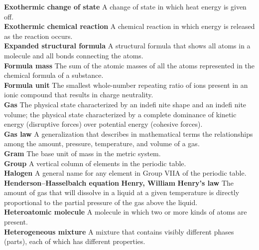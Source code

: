 \documentclass[10pt, roman]{article}
\begin{document}
\begin{minipage}[c]{0.30\textwidth}
\textbf{Exothermic change of state} A change of state in which heat energy is given off. \\
\textbf{Exothermic chemical reaction} A chemical reaction in which energy is released as the reaction occurs. \\
\textbf{Expanded structural formula} A structural formula that shows all atoms in a molecule and all bonds connecting the atoms. \\
\textbf{Formula mass} The sum of the atomic masses of all the atoms represented in the chemical formula of a substance. \\
\textbf{Formula unit} The smallest whole-number repeating ratio of ions present in an ionic compound that results in charge neutrality. \\
\textbf{Gas} The physical state characterized by an indefi nite shape and an indefi nite volume; the physical state characterized by a complete dominance of kinetic energy (disruptive forces) over potential energy (cohesive forces). \\
\textbf{Gas law} A generalization that describes in mathematical terms the relationships among the amount, pressure, temperature, and volume of a gas. \\
\textbf{Gram} The base unit of mass in the metric system. \\
\textbf{Group} A vertical column of elements in the periodic table. \\
\textbf{Halogen} A general name for any element in Group VIIA of the periodic table. \\
\textbf{Henderson–Hasselbalch equation}
\textbf{Henry, William}
\textbf{Henry’s law} The amount of gas that will dissolve in a liquid at a given temperature is directly proportional to the partial pressure of the gas above the liquid. \\
\textbf{Heteroatomic molecule} A molecule in which two or more kinds of atoms are present. \\
\textbf{Heterogeneous mixture} A mixture that contains visibly different phases (parts), each of which has different properties. \\
\end{minipage}%
\newpage
\end{document}
